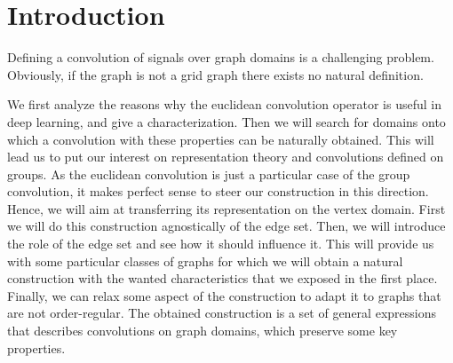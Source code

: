 \section*{Introduction}

Defining a convolution of signals over graph domains is a challenging problem. Obviously, if the graph is not a grid graph there exists no natural definition.

We first analyze the reasons why the euclidean convolution operator is useful in deep learning, and give a characterization. Then we will search for domains onto which a convolution with these properties can be naturally obtained. This will lead us to put our interest on representation theory and convolutions defined on groups. As the euclidean convolution is just a particular case of the group convolution, it makes perfect sense to steer our construction in this direction. Hence, we will aim at transferring its representation on the vertex domain. First we will do this construction agnostically of the edge set. Then, we will introduce the role of the edge set and see how it should influence it. This will provide us with some particular classes of graphs for which we will obtain a natural construction with the wanted characteristics that we exposed in the first place. Finally, we can relax some aspect of the construction to adapt it to graphs that are not order-regular. The obtained construction is a set of general expressions that describes convolutions on graph domains, which preserve some key properties.